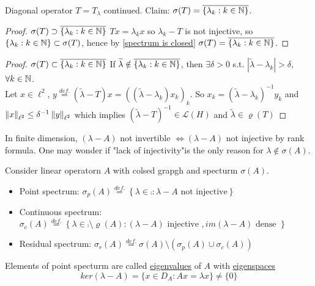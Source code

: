 \documentclass{article}
\begin{document}
\begin{example}\nl
{}
    Diagonal operator $T=T_\lambda$ continued. Claim: $\sigma(T)=\overline{\{\lambda_k:k\in\mathbb{N}\}}$.
\end{example}
\begin{proof}{$\sigma(T)\supset\overline{\{\lambda_k:k\in\mathbb{N}\}}$}{}
    $Tx=\lambda_k x$ so $\lambda_k-T$ is not injective, so $\{\lambda_k:k\in\mathbb{N}\}\subset\sigma(T)$, hence by \cref{spectrum is closed} $\sigma(T)=\overline{\{\lambda_k:k\in\mathbb{N}\}}$.
    \end{proof}

    \begin{proof}{$\sigma(T)\subset\overline{\{\lambda_k:k\in\mathbb{N}\}}$}{}
    If $\widetilde{\lambda}\notin\overline{\{\lambda_k:k\in\mathbb{N}\}}$, then $\exists\delta>0$ s.t. $|\widetilde{\lambda}-\lambda_k|>\delta$, $\forall k\in\mathbb{N}$. \\
    Let $x\in\ell^2$, $y\stackrel{def.}{=}(\widetilde{\lambda}-T)x=((\widetilde{\lambda}-\lambda_k)x_k)_k$. So $x_k=(\widetilde{\lambda}-\lambda_k)^{-1}y_k$ and $\left\|{x}\right\|_{\ell^2}\leq\delta^{-1}\left\|{y}\right\|_{\ell^2}$ which implies $(\widetilde{\lambda}-T)^{-1}\in\mathcal{L}(H)$ and $\widetilde{\lambda}\in\varrho(T)$
    \end{proof}

\begin{remark}\nl
    In finite dimension, $(\lambda-A)$ not invertible $\iff(\lambda-A)$ not injective by rank formula. One may wonder if "lack of injectivity"is the only reason for $\lambda\notin \sigma(A)$.
\end{remark}

\begin{definition}\nl
    Consider linear operatorn $A$ with colsed grapgh and specturm $\sigma(A)$.
    \begin{itemize}
        \item Point spectrum: $\sigma_p(A)\stackrel{def.}{=}
        \left\{
        \lambda\in \comp :\lambda-A \text{ not  injective}
        \right\}$
        \item Continuous spectrum: $\sigma_c(A)\stackrel{def.}{=}
        \left\{
        \lambda\in\comp\setminus\varrho(A):(\lambda-A) \text{ injective }, im(\lambda-A) \text{ dense }        
        \right\}$
        \item Residual spectrum: $\sigma_r(A)\stackrel{def.}{=}\sigma(A)\setminus(
        \sigma_p(A)\cup\sigma_c(A))$         
    \end{itemize}
    Elements of point specturm are called {\underline {eigenvalues} of $A$} with {\underline {eigenspaces}} $$ker(\lambda-A)=\{x\in D_A:Ax=\lambda x\}\neq\{0\}$$
\end{definition}
\end{document}
